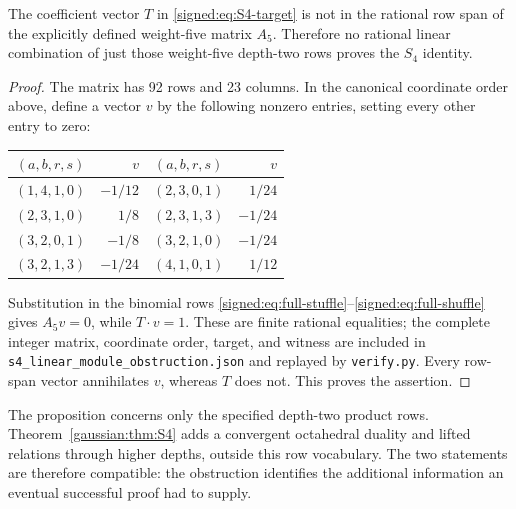 \begin{proposition}\label{signed:prop:S4-obstruction}
The coefficient vector $T$ in \eqref{signed:eq:S4-target} is not in the rational row span of the explicitly defined weight-five matrix $A_5$. Therefore no rational linear combination of just those weight-five depth-two rows proves the $S_4$ identity.
\end{proposition}
\begin{proof}
The matrix has 92 rows and 23 columns. In the canonical coordinate order above, define a vector $v$ by the following nonzero entries, setting every other entry to zero:
\begin{center}
\begin{tabular}{@{}crcr@{}}
\toprule
$(a,b,r,s)$ & $v$ & $(a,b,r,s)$ & $v$\\
\midrule
$(1,4,1,0)$&$-1/12$ & $(2,3,0,1)$&$1/24$\\
$(2,3,1,0)$&$1/8$   & $(2,3,1,3)$&$-1/24$\\
$(3,2,0,1)$&$-1/8$  & $(3,2,1,0)$&$-1/24$\\
$(3,2,1,3)$&$-1/24$ & $(4,1,0,1)$&$1/12$\\
\bottomrule
\end{tabular}
\end{center}
Substitution in the binomial rows \eqref{signed:eq:full-stuffle}--\eqref{signed:eq:full-shuffle} gives $A_5v=0$, while $T\cdot v=1$. These are finite rational equalities; the complete integer matrix, coordinate order, target, and witness are included in
\texttt{s4\_linear\_module\_obstruction.json} and replayed by \texttt{verify.py}. Every row-span vector annihilates $v$, whereas $T$ does not. This proves the assertion.
\end{proof}
The proposition concerns only the specified depth-two product rows.
Theorem~\ref{gaussian:thm:S4} adds a convergent octahedral duality and lifted
relations through higher depths, outside this row vocabulary. The two
statements are therefore compatible: the obstruction identifies the
additional information an eventual successful proof had to supply.


